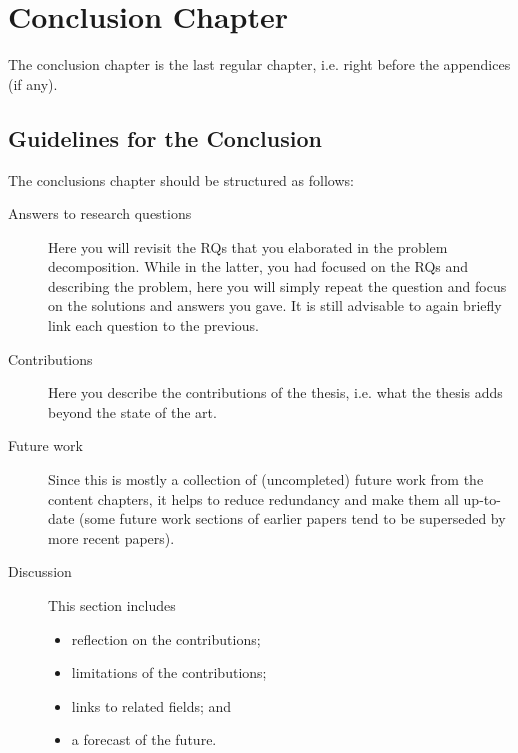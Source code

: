 \renewcommand{\publicationhead}{}

\chapter{Conclusion Chapter}
\label{c9}

The conclusion chapter is the last regular chapter,
i.e. right before the appendices (if any).

\section{Guidelines for the Conclusion}
\label{sec:c9:structure}

The conclusions chapter should be structured as follows:
\begin{description}
	\item [Answers to research questions] Here you will revisit the RQs
	that you elaborated in the problem decomposition. While in the latter,
	you had focused on the RQs and describing the problem,
	here you will simply repeat the question and focus on the solutions
	and answers you gave. It is still advisable to again briefly link
	each question to the previous.
	
	\item [Contributions] Here you describe the contributions of the thesis,
	i.e. what the thesis adds beyond the state of the art.
	
	\item [Future work] Since this is mostly a collection of
	(uncompleted) future work from the content chapters,
	it helps to reduce redundancy and make them all up-to-date
	(some future work sections of earlier papers
	tend to be superseded by more recent papers).
	
	\item [Discussion] This section includes
	\begin{itemize}
		\item reflection on the contributions;
		\item limitations of the contributions;
		\item links to related fields; and
		\item a forecast of the future.
	\end{itemize}
\end{description}
